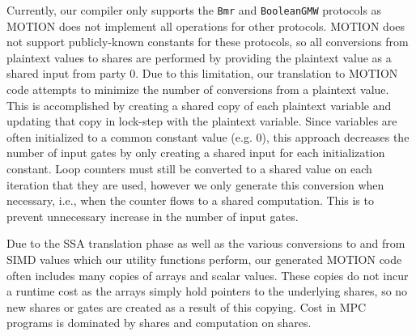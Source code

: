 Currently, our compiler only supports the \texttt{Bmr} and \texttt{BooleanGMW} protocols as MOTION does not implement all operations for other protocols.  MOTION does not support publicly-known constants for these protocols, so all conversions from plaintext values to shares are performed by providing the plaintext value as a shared input from party 0.  Due to this limitation, our translation to MOTION code attempts to minimize the number of conversions from a plaintext value. This is accomplished by creating a shared copy of each plaintext variable and updating that copy in lock-step with the plaintext variable.  Since variables are often initialized to a common constant value (e.g. 0), this approach decreases the number of input gates by only creating a shared input for each initialization constant.  Loop counters must still be converted to a shared value on each iteration that they are used, however we only generate this conversion when necessary, i.e., when the counter flows to a shared computation. This is to prevent unnecessary increase in the number of input gates.

Due to the SSA translation phase as well as the various conversions to and from SIMD values which our utility functions perform, our generated MOTION code often includes many copies of arrays and scalar values.  These copies do not incur a runtime cost as the arrays simply hold pointers to the underlying shares, so no new shares or gates are created as a result of this copying. Cost in MPC programs is dominated by shares and computation on shares.  
